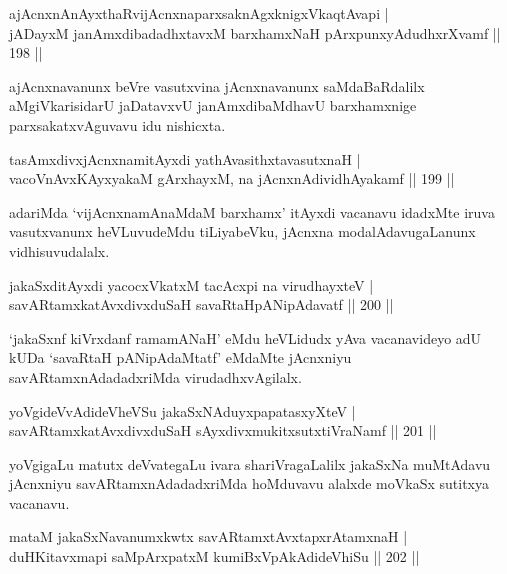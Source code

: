 \begin{shl}
ajAcnxnAnAyxthaRvijAcnxnaparxsaknAgxknigxVkaqtAvapi |\\
jADayxM janAmxdibadadhxtavxM barxhamxNaH pArxpunxyAdudhxrXvamf \hfill || 198 ||
\end{shl}

\begin{artha}
ajAcnxnavanunx beVre vasutxvina jAcnxnavanunx saMdaBaRdalilx aMgiVkarisidarU jaDatavxvU janAmxdibaMdhavU barxhamxnige parxsakatxvAguvavu idu nishicxta.
\end{artha}

\begin{shl}
tasAmxdivxjAcnxnamitAyxdi yathAvasithxtavasutxnaH |\\
vacoV\s nAvxKAyxyakaM gArxhayxM, na jAcnxnAdividhAyakamf \hfill || 199 ||
\end{shl}

\begin{artha}
adariMda `vijAcnxnamAnaMdaM barxhamx' itAyxdi vacanavu idadxMte iruva vasutxvanunx heVLuvudeMdu tiLiyabeVku, jAcnxna modalAdavugaLanunx vidhisuvudalalx.
\end{artha}

\begin{shl}
jakaSxditAyxdi yacocxVkatxM tacAcxpi na virudhayxteV |\\
savARtamxkatAvxdivxduSaH savaRtaHpANipAdavatf \hfill || 200 || 
\end{shl}

\begin{artha}
`jakaSxnf kiVrxdanf ramamANaH' eMdu heVLidudx yAva vacanavideyo adU kUDa `savaRtaH pANipAdaMtatf' eMdaMte jAcnxniyu savARtamxnAdadadxriMda virudadhxvAgilalx. 
\end{artha}

\begin{shl}
yoVgideVvAdideVheVSu jakaSxNAduyxpapatasxyXteV |\\
savARtamxkatAvxdivxduSaH sAyxdivxmukitxsutxtiVraNamf \hfill || 201 ||
\end{shl}

\begin{artha}%
yoVgigaLu matutx deVvategaLu ivara shariVragaLalilx jakaSxNa muMtAdavu jAcnxniyu savARtamxnAdadadxriMda hoMduvavu alalxde moVkaSx sutitxya vacanavu.
\end{artha}

\begin{shl}
mataM jakaSxNavanumxkwtx savARtamxtAvxtapxrAtamxnaH |\\
duHKitavxmapi saMpArxpatxM kumiBxVpAkAdideVhiSu \hfill || 202 ||
\end{shl}

